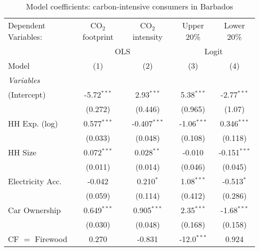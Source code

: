
\begin{table}[htbp!]
   \centering
   \small
   \begin{adjustbox}{width = 1\textwidth, max height = 0.95\textheight, center}
      \begin{threeparttable}[b]
         \caption{\label{tab:Logit_1_BRB} Model coefficients: carbon-intensive consumers in Barbados}
         \begin{tabular}{lcccc}
            \tabularnewline \midrule \midrule
            Dependent Variables: & CO$_{2}$ footprint & CO$_{2}$ intensity & Upper 20\%    & Lower 20\%\\   
             & \multicolumn{2}{c}{OLS} & \multicolumn{2}{c}{Logit} \\ 
            Model                & (1)                & (2)                & (3)           & (4)\\  
            \midrule
            \emph{Variables}\\
            (Intercept)          & -5.72$^{***}$      & 2.93$^{***}$       & 5.38$^{***}$  & -2.77$^{***}$\\   
                                 & (0.272)            & (0.446)            & (0.965)       & (1.07)\\   
            HH Exp. (log)        & 0.577$^{***}$      & -0.407$^{***}$     & -1.06$^{***}$ & 0.346$^{***}$\\   
                                 & (0.033)            & (0.048)            & (0.108)       & (0.118)\\   
            HH Size              & 0.072$^{***}$      & 0.028$^{**}$       & -0.010        & -0.151$^{***}$\\   
                                 & (0.011)            & (0.014)            & (0.046)       & (0.045)\\   
            Electricity Acc.     & -0.042             & 0.210$^{*}$        & 1.08$^{***}$  & -0.513$^{*}$\\   
                                 & (0.059)            & (0.114)            & (0.412)       & (0.286)\\   
            Car Ownership        & 0.649$^{***}$      & 0.905$^{***}$      & 2.35$^{***}$  & -1.68$^{***}$\\   
                                 & (0.030)            & (0.048)            & (0.168)       & (0.158)\\   
            CF $=$ Firewood      & 0.270              & -0.831             & -12.0$^{***}$ & 0.924\\   

\end{tabular}
\end{threeparttable}
\end{adjustbox}
\end{table}
